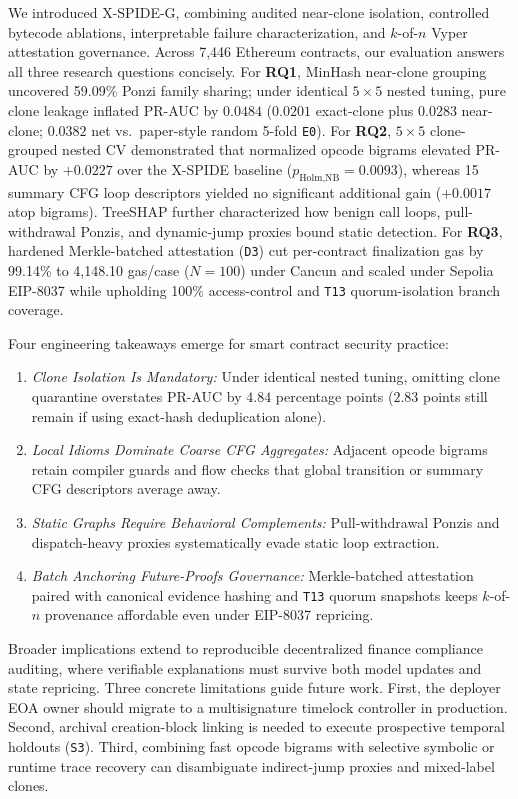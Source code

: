 \documentclass[conference]{IEEEtran}
\begin{document}
We introduced X-SPIDE-G, combining audited near-clone isolation, controlled bytecode ablations, interpretable failure characterization, and $k$-of-$n$ Vyper attestation governance. Across 7,446 Ethereum contracts, our evaluation answers all three research questions concisely. For \textbf{RQ1}, MinHash near-clone grouping uncovered 59.09\% Ponzi family sharing; under identical $5\times 5$ nested tuning, pure clone leakage inflated PR-AUC by $0.0484$ ($0.0201$ exact-clone plus $0.0283$ near-clone; $0.0382$ net vs.\ paper-style random 5-fold \texttt{E0}). For \textbf{RQ2}, $5\times 5$ clone-grouped nested CV demonstrated that normalized opcode bigrams elevated PR-AUC by $+0.0227$ over the X-SPIDE baseline ($p_{\text{Holm,NB}}=0.0093$), whereas 15 summary CFG loop descriptors yielded no significant additional gain ($+0.0017$ atop bigrams). TreeSHAP further characterized how benign call loops, pull-withdrawal Ponzis, and dynamic-jump proxies bound static detection. For \textbf{RQ3}, hardened Merkle-batched attestation (\texttt{D3}) cut per-contract finalization gas by 99.14\% to 4,148.10 gas/case ($N=100$) under Cancun and scaled under Sepolia EIP-8037 while upholding 100\% access-control and \texttt{T13} quorum-isolation branch coverage.

Four engineering takeaways emerge for smart contract security practice:
\begin{enumerate}
\item \emph{Clone Isolation Is Mandatory:} Under identical nested tuning, omitting clone quarantine overstates PR-AUC by $4.84$ percentage points ($2.83$ points still remain if using exact-hash deduplication alone).
\item \emph{Local Idioms Dominate Coarse CFG Aggregates:} Adjacent opcode bigrams retain compiler guards and flow checks that global transition or summary CFG descriptors average away.
\item \emph{Static Graphs Require Behavioral Complements:} Pull-withdrawal Ponzis and dispatch-heavy proxies systematically evade static loop extraction.
\item \emph{Batch Anchoring Future-Proofs Governance:} Merkle-batched attestation paired with canonical evidence hashing and \texttt{T13} quorum snapshots keeps $k$-of-$n$ provenance affordable even under EIP-8037 repricing.
\end{enumerate}

Broader implications extend to reproducible decentralized finance compliance auditing, where verifiable explanations must survive both model updates and state repricing. Three concrete limitations guide future work. First, the deployer EOA owner should migrate to a multisignature timelock controller in production. Second, archival creation-block linking is needed to execute prospective temporal holdouts (\texttt{S3}). Third, combining fast opcode bigrams with selective symbolic or runtime trace recovery can disambiguate indirect-jump proxies and mixed-label clones.



\end{document}
